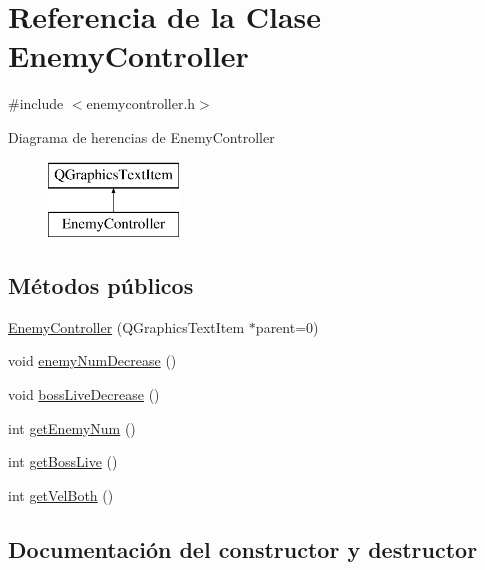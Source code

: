 \hypertarget{class_enemy_controller}{}\section{Referencia de la Clase Enemy\+Controller}
\label{class_enemy_controller}


{\ttfamily \#include $<$enemycontroller.\+h$>$}

Diagrama de herencias de Enemy\+Controller\begin{figure}[H]
\begin{center}
\leavevmode
\includegraphics[height=2.000000cm]{class_enemy_controller}
\end{center}
\end{figure}
\subsection*{Métodos públicos}
\begin{DoxyCompactItemize}
\item 
\hyperlink{class_enemy_controller_a9570c4002701ccbabc2bc1609a1f9369}{Enemy\+Controller} (Q\+Graphics\+Text\+Item $\ast$parent=0)
\item 
void \hyperlink{class_enemy_controller_aabdfabc7ce23fb881552c613000bd510}{enemy\+Num\+Decrease} ()
\item 
void \hyperlink{class_enemy_controller_a7ad51104e0e740217a33cbfcc9b94138}{boss\+Live\+Decrease} ()
\item 
int \hyperlink{class_enemy_controller_a8c6a6d2043bbb543a5bf881d662e3e4d}{get\+Enemy\+Num} ()
\item 
int \hyperlink{class_enemy_controller_af5c777646b3431c543e18bba840a30eb}{get\+Boss\+Live} ()
\item 
int \hyperlink{class_enemy_controller_a9c46c7cc4152f83e2b209ef4bceea150}{get\+Vel\+Both} ()
\end{DoxyCompactItemize}


\subsection{Documentación del constructor y destructor}
\hypertarget{class_enemy_controller_a9570c4002701ccbabc2bc1609a1f9369}{}\label{class_enemy_controller_a9570c4002701ccbabc2bc1609a1f9369} 
